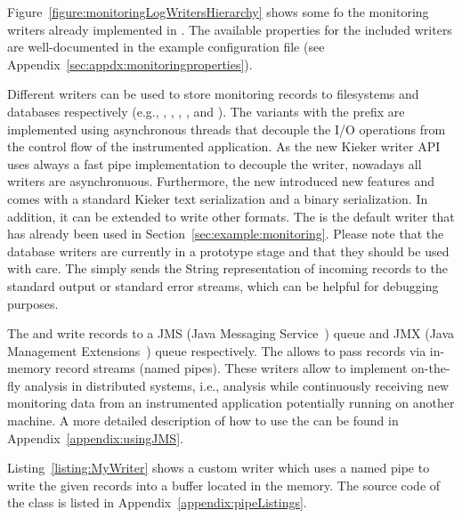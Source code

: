 Figure~\ref{figure:monitoringLogWritersHierarchy} shows some fo the monitoring writers %
already implemented in \KiekerMonitoringPart{}. The available properties for the %
included writers are well-documented in the %
example configuration file (see Appendix~\ref{sec:appdx:monitoringproperties}). %


Different writers can be used %
to store monitoring records to filesystems and databases respectively (e.g., , , %
, , and ). %
The variants with the prefix  are implemented using asynchronous %
threads that decouple the I/O operations from the control flow of the %
instrumented application. %
As the new Kieker writer API uses always a fast pipe implementation to decouple the writer, nowadays all writers are asynchronuous.
Furthermore, the new  introduced new features and comes with a standard Kieker text serialization and a binary serialization.
In addition, it can be extended to write other formats.
The  is the default writer that has already been used in %
Section~\ref{sec:example:monitoring}. %
Please note that the database writers are currently in a prototype stage and
that they should be used with care. %
The  simply sends the String representation of incoming %
records to the standard output or standard error streams, which can be helpful %
for debugging purposes.

The  and  write records to a JMS %
(Java Messaging Service~\cite{JMS-WebSite}) queue and JMX (Java Management %
Extensions~\cite{JMX-Website}) queue respectively. The  %
allows to pass records via in-memory record streams (named pipes). %
These writers allow to implement on-the-fly analysis in distributed systems, i.e., analysis while %
continuously receiving new monitoring data from an instrumented application potentially %
running on another machine. A more detailed description of how to use the  %
can be found in Appendix~\ref{appendix:usingJMS}. %

\noindent Listing~\ref{listing:MyWriter} %
shows %
a custom writer  which uses a named pipe to %
write the given records into a buffer located in the memory. The source code of %
the class  is listed in Appendix~\ref{appendix:pipeListings}. %


